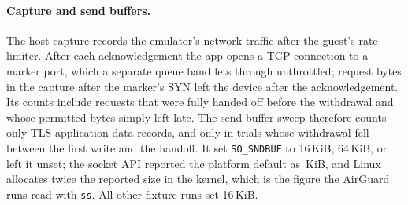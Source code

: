 \paragraph{Capture and send buffers.}\label{app:capture} The host capture records the emulator's network traffic after the guest's rate
limiter. After each acknowledgement the app opens a TCP connection to a marker port, which a separate queue band lets
through unthrottled; request bytes in the capture after the marker's SYN left the device after the acknowledgement. Its
counts include requests that were fully handed off before the withdrawal and whose permitted bytes simply left late. The
send-buffer sweep therefore counts only TLS application-data records, and only in trials whose withdrawal fell between
the first write and the handoff. It set \texttt{SO\_SNDBUF} to 16\,KiB, 64\,KiB, or left it unset; the socket API
reported the platform default as \gsDefaultKib{}\,KiB, and Linux allocates twice the reported size in the kernel, which
is the figure the AirGuard runs read with \texttt{ss}. All other fixture runs set 16\,KiB.

